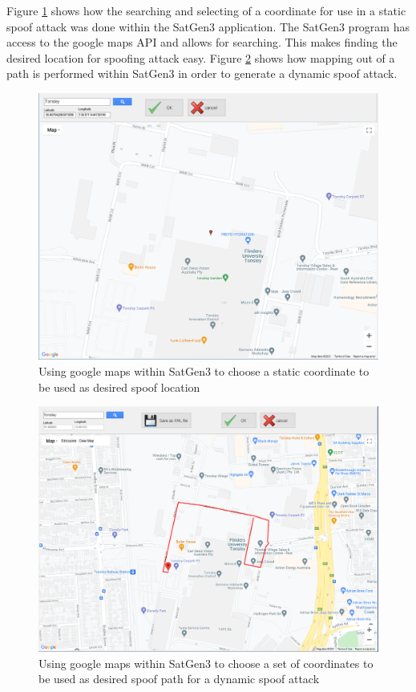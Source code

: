 Figure \ref{fig:StaticCoordinate} shows how the searching and selecting of a coordinate for use in a static spoof attack was done within the SatGen3 application. The
SatGen3 program has access to the google maps API and allows for searching. This makes finding the desired location for spoofing attack easy. 
Figure \ref{fig:DynamicCoordinate} shows how mapping out of a path is performed within SatGen3 in order to generate a dynamic spoof attack.

\begin{figure}
    \begin{centering}
        \includegraphics[width=12cm,keepaspectratio]{Figures/static coordinates setup.png}
        \caption{Using google maps within SatGen3 to choose a static coordinate to be used as desired spoof location}
    \label{fig:StaticCoordinate}
    \end{centering}
\end{figure}

\begin{figure}[ht]
    \begin{centering}
        \includegraphics[width=12cm,keepaspectratio]{Figures/dynamic coordinates setup.png}
        \caption{Using google maps within SatGen3 to choose a set of coordinates to be used as desired spoof path for a dynamic spoof attack}
    \label{fig:DynamicCoordinate}
    \end{centering}
\end{figure}


